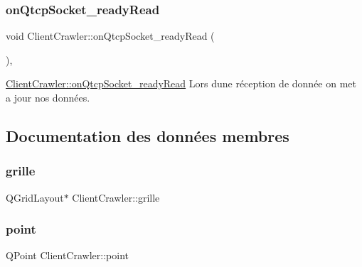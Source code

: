 \subsubsection{\texorpdfstring{on\+Qtcp\+Socket\+\_\+ready\+Read}{onQtcpSocket\_readyRead}}
{\footnotesize\ttfamily void Client\+Crawler\+::on\+Qtcp\+Socket\+\_\+ready\+Read (\begin{DoxyParamCaption}{ }\end{DoxyParamCaption})\hspace{0.3cm}{\ttfamily [private]}, {\ttfamily [slot]}}



\hyperlink{class_client_crawler_a7e2e23f7d3b9e8ea84e3fbd3e88a7c56}{Client\+Crawler\+::on\+Qtcp\+Socket\+\_\+ready\+Read} Lors d\textquotesingle{}une réception de donnée on met a jour nos données. 



\subsection{Documentation des données membres}
\mbox{\label{class_client_crawler_ac32bb3ac1812334a2232d462f65e28d2}} 
\subsubsection{\texorpdfstring{grille}{grille}}
{\footnotesize\ttfamily Q\+Grid\+Layout$\ast$ Client\+Crawler\+::grille\hspace{0.3cm}{\ttfamily [private]}}

\mbox{\label{class_client_crawler_acbc6c229a23b06f5e60b1845c687e513}} 
\subsubsection{\texorpdfstring{point}{point}}
{\footnotesize\ttfamily Q\+Point Client\+Crawler\+::point\hspace{0.3cm}{\ttfamily [private]}}

\mbox{\label{class_client_crawler_a7796ea05089d10bd1c5a6158b8cd8c89}} 
